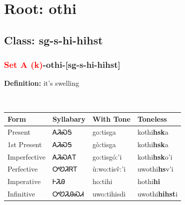 \needspace{4in}
\section*{Root: othi}
\nopagebreak
{}
\needspace{3in}
\subsection*{Class: sg-s-hi-hihst}
\nopagebreak
\needspace{2in}
\subsubsection*{\textcolor{Red}{Set A (k)}{-}\textbf{othi}{-}[sg-s-hi-hihst]}
\nopagebreak
\textbf{Definition: } it{\textquoteright}s swelling
\\[0.5em]
\begin{tabularx}{\textwidth}{l X X X}%
\toprule%
\textbf{Form}&\textbf{Syllabary}&\textbf{With Tone}&\textbf{Toneless}\\%
\midrule%
Present&ᎪᏘᏍᎦ&go:tisga&kothi\textbf{hsk}a\\%
1st Present&ᎪᏘᏍᎦ&gò:tisga&kothi\textbf{hsk}a\\%
Imperfective&ᎪᏘᏍᎪᎢ&go:tisgó:’i&kothi\textbf{hsk}o'i\\%
Perfective&ᎤᏬᏘᏒᎢ&ù:wo:tisv̌:’i&uwothi\textbf{hs}v'i\\%
Imperative&ᎰᏘᎯ&ho:tihi&hothi\textbf{hi}\\%
Infinitive&ᎤᏬᏘᎯᏍᏗ&uwo:tihisdi&uwothi\textbf{hihst}i\\%
\bottomrule%
\end{tabularx}
\\[1em]